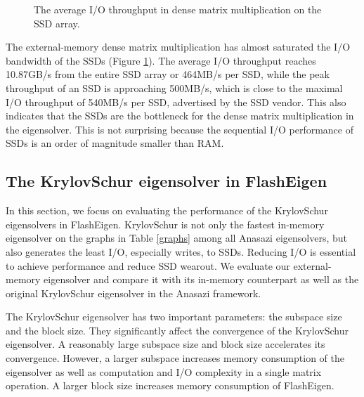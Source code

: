 \begin{figure}
	\begin{center}
		\footnotesize
		\vspace{-15pt}
		
		\vspace{-15pt}
		\caption{The average I/O throughput in dense matrix multiplication
		on the SSD array.}
		\label{perf:dmm_io}
	\end{center}
\end{figure}

The external-memory dense matrix multiplication has almost saturated
the I/O bandwidth of the SSDs (Figure \ref{perf:dmm_io}). The average
I/O throughput reaches 10.87GB/s from the entire SSD array or 464MB/s
per SSD, while the peak throughput of an SSD is approaching 500MB/s,
which is close to the maximal I/O throughput of 540MB/s per SSD, advertised by
the SSD vendor. This also indicates that the SSDs are the bottleneck for
the dense matrix multiplication in the eigensolver. This is not
surprising because the sequential I/O performance of SSDs is an order of
magnitude smaller than RAM. 

\subsection{The KrylovSchur eigensolver in FlashEigen}
In this section, we focus on evaluating the performance of the KrylovSchur
eigensolvers in FlashEigen. KrylovSchur is not only the fastest in-memory
eigensolver on the graphs in Table \ref{graphs} among all Anasazi eigensolvers,
but also generates the least I/O, especially writes,
to SSDs. Reducing I/O is essential to achieve performance and reduce SSD
wearout. We evaluate our external-memory eigensolver and compare it
with its in-memory counterpart as well as the original KrylovSchur eigensolver
in the Anasazi framework.

The KrylovSchur eigensolver has two important parameters: the subspace size
and the block size. They significantly affect the convergence of
the KrylovSchur eigensolver. A reasonably large subspace size and block size
accelerates its convergence. However, a larger subspace increases memory
consumption of the eigensolver as well as computation and I/O complexity
in a single matrix operation. A larger block size increases memory consumption
of FlashEigen.

